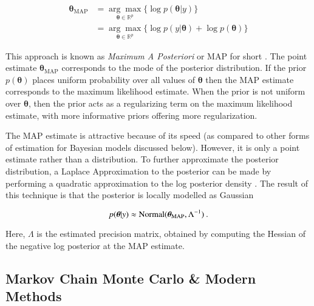 \begin{align}
	\bm{\theta}_{\text{MAP}} &= \underset{\bm{\theta} \in \mathbb{R}^p}{\arg\max} \Big\{ \log p(\bm{\theta} \vert y) \Big\} \nonumber \\ 
	& = \underset{\bm{\theta} \in \mathbb{R}^p}{\arg\max} \Big\{\log p(y \vert \bm{\theta}) + \log p(\bm{\theta}) \Big\}  \nonumber
\end{align}

\noindent This approach is known as \textit{Maximum A Posteriori} or MAP for short \cite{murphy2012machine}.  The point estimate  $\bm{\theta}_{\text{MAP}} $ corresponds to the mode of the posterior distribution.  If the prior $p(\bm{\theta})$ places uniform probability over all values of $\bm{\theta}$ then the MAP estimate corresponds to the maximum likelihood estimate.  When the prior  is not uniform over $\bm{\theta}$, then the prior acts as a regularizing term on the maximum likelihood estimate, with more informative priors offering more regularization.

The MAP estimate is attractive because of its speed (as compared to other forms of estimation for Bayesian models discussed below).  However, it is only a point estimate rather than a distribution.  To further approximate the posterior distribution, a Laplace Approximation to the posterior can be made by performing a quadratic approximation to the log posterior density \cite{murphy2012machine}.  The result of this technique is that the posterior is locally modelled as Gaussian

$$ p(\bm{\theta} \vert y)  \approx \operatorname{Normal}(\bm{\theta}_{\text{MAP}}, \Lambda^{-1}) \>. $$

\noindent Here, $\Lambda$ is the estimated precision matrix, obtained by computing the Hessian of the negative log posterior at the MAP estimate.


\subsection{Markov Chain Monte Carlo \& Modern Methods}

